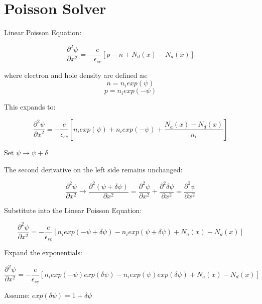 \documentclass[12pt]{article}
\begin{document}
\section{Poisson Solver}

Linear Poisson Equation:

\begin{equation}
	\frac{\partial^{2} \psi}{\partial x^{2}} =
	-\frac{e}{\epsilon_{sc}}
	[p-n+N_{d}(x)-N_{a}(x)]
\end{equation}

where electron and hole density are defined as:
\begin{equation}
	n=n_{i}exp(\psi)
\end{equation}
\begin{equation}
	p=n_{i}exp(-\psi)
\end{equation}

This expands to:

\begin{equation}
	\frac{\partial^{2} \psi}{\partial x^{2}} =
	-\frac{e}{\epsilon_{sc}}
	[n_{i}exp(\psi)+n_{i}exp(-\psi)+\frac{N_{a}(x)-N_{d}(x)}{n_{i}}]
\end{equation}

Set $ \psi \rightarrow \psi + \delta $

The second derivative on the left side remains unchanged:

\begin{equation}
\frac{\partial^{2} \psi}{\partial x^{2}} 
\rightarrow
\frac{\partial^{2} (\psi + \delta \psi)}{\partial x^{2}} 
=
\frac{\partial^{2} \psi}{\partial x^{2}} +
\frac{\partial^{2} \delta \psi}{\partial x^{2}} 
=
\frac{\partial^{2} \psi}{\partial x^{2}}
\end{equation}

Substitute into the Linear Poisson Equation:

\begin{equation}
\frac{\partial^{2} \psi}{\partial x^{2}} =
-\frac{e}{\epsilon_{sc}}
[n_{i}exp(-\psi + \delta \psi)-n_{i}exp(\psi + \delta \psi)+N_{a}(x)-N_{d}(x)]
\end{equation}

Expand the exponentials:

\begin{equation}
\frac{\partial^{2} \psi}{\partial x^{2}} =
-\frac{e}{\epsilon_{sc}}
[n_{i}exp(-\psi)exp(\delta \psi)-n_{i}exp(\psi)exp(\delta \psi)+N_{a}(x)-N_{d}(x)]
\end{equation}

Assume: $ exp(\delta \psi) = 1 + \delta \psi$
\end{document}
